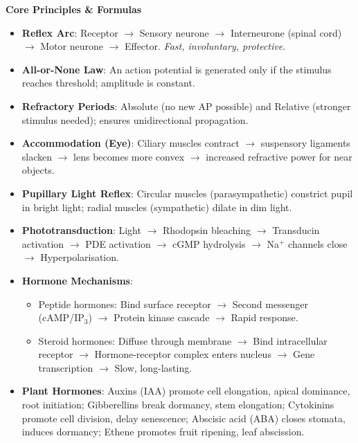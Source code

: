 \documentclass[11pt]{article}
\begin{document}
\begin{bilan}
\textbf{Core Principles \& Formulas}
\begin{itemize}
  \item \textbf{Reflex Arc}: Receptor $\to$ Sensory neurone $\to$ Interneurone (spinal cord) $\to$ Motor neurone $\to$ Effector. \emph{Fast, involuntary, protective}.
  \item \textbf{All-or-None Law}: An action potential is generated only if the stimulus reaches threshold; amplitude is constant.
  \item \textbf{Refractory Periods}: Absolute (no new AP possible) and Relative (stronger stimulus needed); ensures unidirectional propagation.
  \item \textbf{Accommodation (Eye)}: Ciliary muscles contract $\to$ suspensory ligaments slacken $\to$ lens becomes more convex $\to$ increased refractive power for near objects.
  \item \textbf{Pupillary Light Reflex}: Circular muscles (parasympathetic) constrict pupil in bright light; radial muscles (sympathetic) dilate in dim light.
  \item \textbf{Phototransduction}: Light $\to$ Rhodopsin bleaching $\to$ Transducin activation $\to$ PDE activation $\to$ cGMP hydrolysis $\to$ Na$^+$ channels close $\to$ Hyperpolarisation.
  \item \textbf{Hormone Mechanisms}:
    \begin{itemize}
      \item Peptide hormones: Bind surface receptor $\to$ Second messenger (cAMP/IP$_3$) $\to$ Protein kinase cascade $\to$ Rapid response.
      \item Steroid hormones: Diffuse through membrane $\to$ Bind intracellular receptor $\to$ Hormone-receptor complex enters nucleus $\to$ Gene transcription $\to$ Slow, long-lasting.
    \end{itemize}
  \item \textbf{Plant Hormones}: Auxins (IAA) promote cell elongation, apical dominance, root initiation; Gibberellins break dormancy, stem elongation; Cytokinins promote cell division, delay senescence; Abscisic acid (ABA) closes stomata, induces dormancy; Ethene promotes fruit ripening, leaf abscission.
\end{itemize}


\end{bilan}
\end{document}

